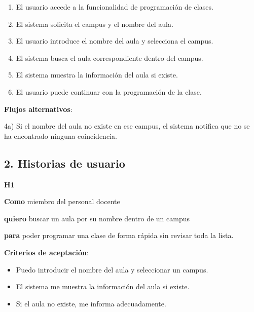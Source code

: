 \begin{solucion}
    \begin{enumerate}
        \item El usuario accede a la funcionalidad de programación de clases.
        \item El sistema solicita el campus y el nombre del aula.
        \item El usuario introduce el nombre del aula y selecciona el campus.
        \item El sistema busca el aula correspondiente dentro del campus.
        \item El sistema muestra la información del aula si existe.
        \item El usuario puede continuar con la programación de la clase.
    \end{enumerate}
    \textbf{Flujos alternativos}:

    4a) Si el nombre del aula no existe en ese campus, el sistema notifica que no se ha encontrado ninguna coincidencia.
\end{solucion}

\subsection{2. Historias de usuario}\label{subsec:2.-historias-de-usuario}
\begin{solucion}
    \textbf{H1}

    \textbf{Como} miembro del personal docente

    \textbf{quiero} buscar un aula por su nombre dentro de un campus

    \textbf{para} poder programar una clase de forma rápida sin revisar toda la lista.

    \textbf{Criterios de aceptación}:
    \begin{itemize}
        \item Puedo introducir el nombre del aula y seleccionar un campus.
        \item El sistema me muestra la información del aula si existe.
        \item Si el aula no existe, me informa adecuadamente.
    \end{itemize}

\end{solucion}